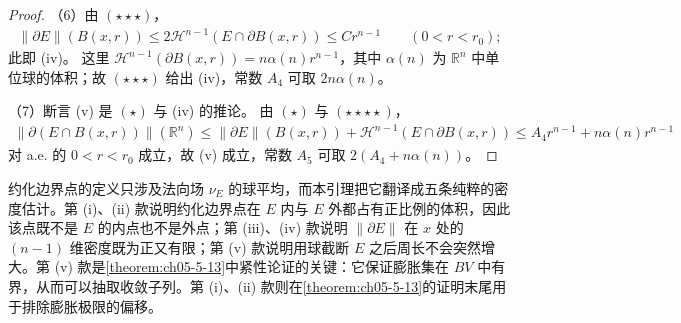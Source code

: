 \documentclass[../../main.tex]{subfiles}%
\begin{document}
\begin{proof}
（6）由 $(\star\star\star)$，
\begin{align*}
\lVert\partial E\rVert(B(x,r))\leqslant2\mathcal{H}^{n-1}(E\cap\partial B(x,r))\leqslant Cr^{n-1}\qquad(0<r<r_0);
\end{align*}
此即 (iv)。
这里 $\mathcal{H}^{n-1}(\partial B(x,r))=n\alpha(n)r^{n-1}$，其中 $\alpha(n)$ 为 $\mathbb{R}^n$ 中单位球的体积；故 $(\star\star\star)$ 给出 (iv)，常数 $A_4$ 可取 $2n\alpha(n)$。

（7）断言 (v) 是 $(\star)$ 与 (iv) 的推论。
由 $(\star)$ 与 $(\star\star\star\star)$，
\begin{align*}
\lVert\partial(E\cap B(x,r))\rVert(\mathbb{R}^n)\leqslant\lVert\partial E\rVert(B(x,r))+\mathcal{H}^{n-1}(E\cap\partial B(x,r))\leqslant A_4r^{n-1}+n\alpha(n)r^{n-1}
\end{align*}
对 a.e. 的 $0<r<r_0$ 成立，故 (v) 成立，常数 $A_5$ 可取 $2(A_4+n\alpha(n))$。
\end{proof}

\begin{remark}\label{remark:ch05-lem-5-3-动机}
约化边界点的定义只涉及法向场 $\nu_E$ 的球平均，而本引理把它翻译成五条纯粹的密度估计。第 (i)、(ii) 款说明约化边界点在 $E$ 内与 $E$ 外都占有正比例的体积，因此该点既不是 $E$ 的内点也不是外点；第 (iii)、(iv) 款说明 $\lVert\partial E\rVert$ 在 $x$ 处的 $(n-1)$ 维密度既为正又有限；第 (v) 款说明用球截断 $E$ 之后周长不会突然增大。第 (v) 款是\cref{theorem:ch05-5-13}中紧性论证的关键：它保证膨胀集在 $BV$ 中有界，从而可以抽取收敛子列。第 (i)、(ii) 款则在\cref{theorem:ch05-5-13}的证明末尾用于排除膨胀极限的偏移。%
\end{remark}
\end{document}
